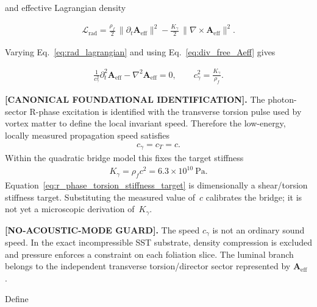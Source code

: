\documentclass[11pt]{article}
\theoremstyle{definition}
\theoremstyle{plain}
\theoremstyle{remark}
\newcommand{\rhoF}{{\rho_{\!f}}}
\begin{document}
        and effective Lagrangian density

        \begin{align}
            \mathcal{L}_{\mathrm{rad}}
            =
            \frac{\rhoF}{2}\,\lVert \partial_t \mathbf{A}_{\mathrm{eff}}\rVert^2
            -
            \frac{K_\gamma}{2}\,\lVert \nabla\times\mathbf{A}_{\mathrm{eff}}\rVert^2.
            \label{eq:rad_lagrangian}
        \end{align}

        Varying Eq.~\eqref{eq:rad_lagrangian} and using Eq.~\eqref{eq:div_free_Aeff} gives

        \begin{align}
            \frac{1}{c_\gamma^2}\partial_t^2 \mathbf{A}_{\mathrm{eff}} - \nabla^2 \mathbf{A}_{\mathrm{eff}} = 0,
            \qquad
            c_\gamma^2 = \frac{K_\gamma}{\rhoF}.
            \label{eq:vector_wave_Aeff}
        \end{align}

        \textbf{[CANONICAL FOUNDATIONAL IDENTIFICATION].}
        The photon-sector R-phase excitation is identified with the transverse torsion pulse used by vortex matter to define the local invariant speed. Therefore the low-energy, locally measured propagation speed satisfies
        \begin{align}
            c_\gamma=c_T=c.
            \label{eq:r_phase_operational_light_speed}
        \end{align}
        Within the quadratic bridge model this fixes the target stiffness
        \begin{align}
            K_\gamma
            =
            \rhoF c^2
            =
            6.3\times10^{10}\ \mathrm{Pa}.
            \label{eq:r_phase_torsion_stiffness_target}
        \end{align}
        Equation~\eqref{eq:r_phase_torsion_stiffness_target} is dimensionally a shear/torsion stiffness target. Substituting the measured value of~\(c\) calibrates the bridge; it is not yet a microscopic derivation of~\(K_\gamma\).

        \textbf{[NO-ACOUSTIC-MODE GUARD].}
        The speed \(c_\gamma\) is not an ordinary sound speed. In the exact incompressible SST substrate, density compression is excluded and pressure enforces a constraint on each foliation slice. The luminal branch belongs to the independent transverse torsion/director sector represented by \(\mathbf A_{\mathrm{eff}}\) \cite{BarceloLiberatiVisser2026}.

        Define
\end{document}
